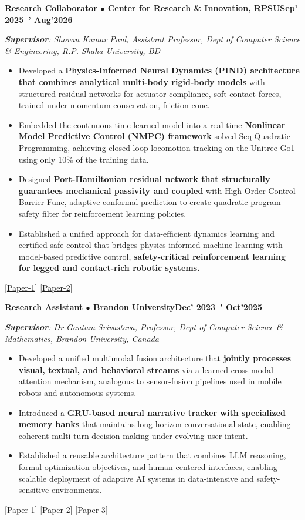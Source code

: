 \documentclass[10pt,letterpaper]{article}
\newcommand{\entry}[2]{\vspace{2pt}\par\noindent\textbf{#1}\hfill\textbf{#2}\par\nopagebreak}
\newcommand{\supv}[1]{\noindent\hspace{0.8em}\textit{\textbf{Supervisor}: #1}\par\nopagebreak}
\newcommand{\lk}[2]{[\href{#1}{#2}]}
\begin{document}
\entry{Research Collaborator $\bullet$ Center for Research \& Innovation, RPSU}{Sep' 2025--' Aug'2026}
\supv{Shovan Kumar Paul, Assistant Professor, Dept of Computer Science \& Engineering, R.P. Shaha University, BD}
\begin{itemize}
  \item Developed a \textbf{Physics-Informed Neural Dynamics (PIND) architecture that combines analytical multi-body rigid-body models} with structured residual networks for actuator compliance, soft contact forces, trained under momentum conservation, friction-cone.
  \item Embedded the continuous-time learned model into a real-time \textbf{Nonlinear Model Predictive Control (NMPC) framework} solved Seq Quadratic Programming, achieving closed-loop locomotion tracking on the Unitree Go1 using only 10\% of the training data.
  \item Designed \textbf{Port-Hamiltonian residual network that structurally guarantees mechanical passivity and coupled} with High-Order Control Barrier Func, adaptive conformal prediction to create quadratic-program safety filter for reinforcement learning policies.
  \item Established a unified approach for data-efficient dynamics learning and certified safe control that bridges physics-informed machine learning with model-based predictive control, \textbf{safety-critical reinforcement learning for legged and contact-rich robotic systems.}
\end{itemize}
\hspace{1.6em}\lk{https://drive.google.com/file/d/1JgQ5MCCtngnDuA6jOblR9TN_yVb0A4v6/view?usp=sharing}{Paper-1} \lk{https://drive.google.com/file/d/1NxOR6ds-d3xFB5gi_pmYLFTv_YaVoGMo/view}{Paper-2}

\entry{Research Assistant $\bullet$ Brandon University}{Dec' 2023--' Oct'2025}
\supv{Dr Gautam Srivastava, Professor, Dept of Computer Science \& Mathematics, Brandon University, Canada}
\begin{itemize}
  \item Developed a unified multimodal fusion architecture that \textbf{jointly processes visual, textual, and behavioral streams} via a learned cross-modal attention mechanism, analogous to sensor-fusion pipelines used in mobile robots and autonomous systems.
  \item Introduced a \textbf{GRU-based neural narrative tracker with specialized memory banks} that maintains long-horizon conversational state, enabling coherent multi-turn decision making under evolving user intent.
  \item Established a reusable architecture pattern that combines LLM reasoning, formal optimization objectives, and human-centered interfaces, enabling scalable deployment of adaptive AI systems in data-intensive and safety-sensitive environments.
\end{itemize}
\hspace{1.6em}\lk{https://drive.google.com/file/d/1r5o2D66ZTg2VrMklkl8sxKoeGuwLQEVY/view}{Paper-1} \lk{https://drive.google.com/file/d/1NxOR6ds-d3xFB5gi_pmYLFTv_YaVoGMo/view}{Paper-2} \lk{https://drive.google.com/file/d/1ueDIfEE3TNvnEfAcWhqCBkrGW8HlX74C/view?usp=sharing}{Paper-3}
\end{document}
